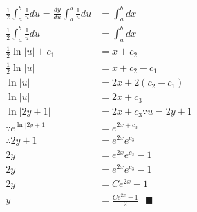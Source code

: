 \documentclass[10pt]{article}
\begin{document}
  \begin{align}
    \frac{1}{2} \int_a^b \frac{1}{u} du = \frac{dy}{du} \int_a^b \frac{1}{u} du &= \int_a^b dx \\
    \frac{1}{2} \int_a^b \frac{1}{u} du &= \int_a^b dx \\
    \frac{1}{2} \ln|u| + c_1 &= x + c_2 \\
    \frac{1}{2} \ln|u| &= x + c_2 - c_1 \\
    \ln|u| &= 2 x + 2 (c_2 - c_1) \\
    \ln|u| &= 2 x + c_3 \\
    \ln|2y+1| &= 2 x + c_3 \because u = 2y+1 \\
    \because e^{\ln|2y+1|} &= e^{2 x + c_3} \\
    \therefore 2y+1 &= e^{2x}e^{c_3} \\
    2y &= e^{2x}e^{c_3} - 1 \\
    2y &= e^{2x}e^{c_3} - 1 \\
    2y &= C e^{2x} - 1 \\
    y  &= \frac{C e^{2x} - 1}{2} \ \ \ \blacksquare
  \end{align}
\end{document}
